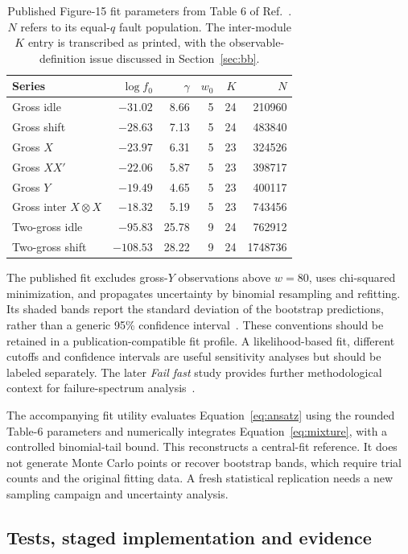 \documentclass[11pt,a4paper]{article}
\begin{document}
\begin{table}[tb]
\centering\small
\caption{Published Figure-15 fit parameters from Table 6 of Ref.~\cite{tdg}. $N$ refers to its equal-$q$ fault population. The inter-module $K$ entry is transcribed as printed, with the observable-definition issue discussed in Section~\ref{sec:bb}.}
\label{tab:fits}
\begin{tabular}{lrrrrr}
\toprule
Series & $\log f_0$ & $\gamma$ & $w_0$ & $K$ & $N$\\\midrule
Gross idle & $-31.02$ & 8.66 & 5 & 24 & 210960\\
Gross shift & $-28.63$ & 7.13 & 5 & 24 & 483840\\
Gross $X$ & $-23.97$ & 6.31 & 5 & 23 & 324526\\
Gross $XX'$ & $-22.06$ & 5.87 & 5 & 23 & 398717\\
Gross $Y$ & $-19.49$ & 4.65 & 5 & 23 & 400117\\
Gross inter $X\otimes X$ & $-18.32$ & 5.19 & 5 & 23 & 743456\\
Two-gross idle & $-95.83$ & 25.78 & 9 & 24 & 762912\\
Two-gross shift & $-108.53$ & 28.22 & 9 & 24 & 1748736\\\bottomrule
\end{tabular}
\end{table}

The published fit excludes gross-$Y$ observations above $w=80$, uses chi-squared minimization, and propagates uncertainty by binomial resampling and refitting. Its shaded bands report the standard deviation of the bootstrap predictions, rather than a generic 95\% confidence interval~\cite{tdg}. These conventions should be retained in a publication-compatible fit profile. A likelihood-based fit, different cutoffs and confidence intervals are useful sensitivity analyses but should be labeled separately. The later \emph{Fail fast} study provides further methodological context for failure-spectrum analysis~\cite{failfast}.

The accompanying fit utility evaluates Equation~\eqref{eq:ansatz} using the rounded Table-6 parameters and numerically integrates Equation~\eqref{eq:mixture}, with a controlled binomial-tail bound. This reconstructs a central-fit reference. It does not generate Monte Carlo points or recover bootstrap bands, which require trial counts and the original fitting data. A fresh statistical replication needs a new sampling campaign and uncertainty analysis.

\subsection{Tests, staged implementation and evidence}
\end{document}
